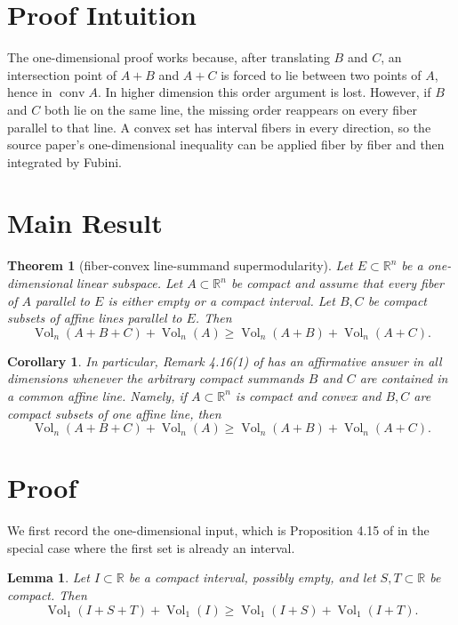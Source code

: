 \documentclass[11pt]{article}
\newtheorem{theorem}{Theorem}
\newtheorem{corollary}{Corollary}
\newtheorem{lemma}{Lemma}
\newcommand{\R}{\mathbb{R}}
\newcommand{\vol}{\operatorname{Vol}}
\newcommand{\conv}{\operatorname{conv}}
\begin{document}
\section*{Proof Intuition}

The one-dimensional proof works because, after translating \(B\) and \(C\), an
intersection point of \(A+B\) and \(A+C\) is forced to lie between two points of
\(A\), hence in \(\conv A\). In higher dimension this order argument is lost.
However, if \(B\) and \(C\) both lie on the same line, the missing order
reappears on every fiber parallel to that line. A convex set has interval
fibers in every direction, so the source paper's one-dimensional inequality can
be applied fiber by fiber and then integrated by Fubini.

\section*{Main Result}

\begin{theorem}[fiber-convex line-summand supermodularity]
\label{thm:fiber}
Let \(E\subset\R^n\) be a one-dimensional linear subspace. Let
\(A\subset\R^n\) be compact and assume that every fiber of \(A\) parallel to
\(E\) is either empty or a compact interval. Let \(B,C\) be compact subsets of
affine lines parallel to \(E\). Then
\[
  \vol_n(A+B+C)+\vol_n(A)\ge \vol_n(A+B)+\vol_n(A+C).
\]
\end{theorem}

\begin{corollary}
In particular, Remark 4.16(1) of \cite{FMMZ2018} has an affirmative answer in
all dimensions whenever the arbitrary compact summands \(B\) and \(C\) are
contained in a common affine line. Namely, if \(A\subset\R^n\) is compact and
convex and \(B,C\) are compact subsets of one affine line, then
\[
  \vol_n(A+B+C)+\vol_n(A)\ge \vol_n(A+B)+\vol_n(A+C).
\]
\end{corollary}

\section*{Proof}

We first record the one-dimensional input, which is Proposition 4.15 of
\cite{FMMZ2018} in the special case where the first set is already an interval.

\begin{lemma}
\label{lem:oned}
Let \(I\subset\R\) be a compact interval, possibly empty, and let
\(S,T\subset\R\) be compact. Then
\[
  \vol_1(I+S+T)+\vol_1(I)
  \ge \vol_1(I+S)+\vol_1(I+T).
\]
\end{lemma}
\end{document}
